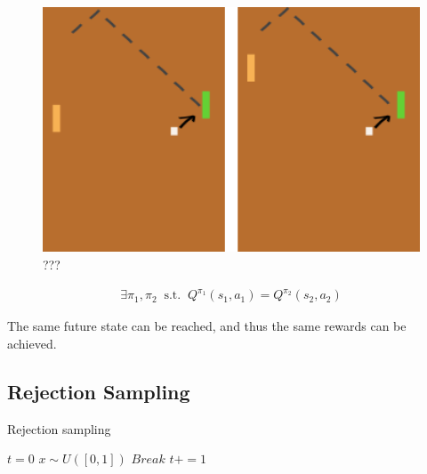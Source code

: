 \begin{figure}
\centering
\includegraphics[width=1\textwidth,height=0.25\textheight]{../../pictures/drawings/pong-reach.png}
\caption{???}
\end{figure}

\begin{align}
\exists \pi_1, \pi_2 \;\;\text{s.t.} \;\; Q^{\pi_1}(s_1, a_1) = Q^{\pi_2}(s_2, a_2)
\end{align}

The same future state can be reached, and thus the same rewards can be
achieved.

\subsection{Rejection Sampling}\label{rejection-sampling}

\begin{algorithm}
	\caption{Rejection sampling}
	\begin{algorithmic}[1]

		\State $t=0$
			\State $x\sim U([0, 1])$
				\State $Break$
			\EndIf
			\State $t += 1$
		\EndWhile
		\State {}
		\EndProcedure

	\end{algorithmic}
\end{algorithm}
